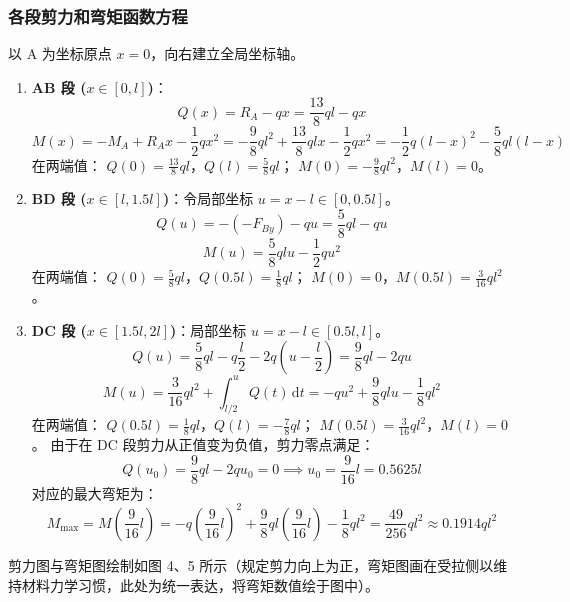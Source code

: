 \documentclass[UTF8,fontset=windows]{ctexart}
\newcommand{\diff}{\,\mathrm{d}}
\begin{document}
\subsubsection*{各段剪力和弯矩函数方程}
以 A 为坐标原点 $x=0$，向右建立全局坐标轴。
\begin{enumerate}
    \item \textbf{AB 段 ($x \in [0, l]$)}：
          \[
              Q(x) = R_A - qx = \frac{13}{8} ql - qx
          \]
          \[
              M(x) = -M_A + R_A x - \frac{1}{2} qx^2 = -\frac{9}{8} ql^2 + \frac{13}{8} qlx - \frac{1}{2} qx^2 = -\frac{1}{2}q(l-x)^2 - \frac{5}{8}ql(l-x)
          \]
          在两端值：
          $Q(0) = \frac{13}{8} ql$，$Q(l) = \frac{5}{8} ql$；
          $M(0) = -\frac{9}{8} ql^2$，$M(l) = 0$。
    \item \textbf{BD 段 ($x \in [l, 1.5l]$)}：令局部坐标 $u = x-l \in [0, 0.5l]$。
          \[
              Q(u) = -(-F_{By}) - qu = \frac{5}{8} ql - qu
          \]
          \[
              M(u) = \frac{5}{8} ql u - \frac{1}{2} qu^2
          \]
          在两端值：
          $Q(0) = \frac{5}{8} ql$，$Q(0.5l) = \frac{1}{8} ql$；
          $M(0) = 0$，$M(0.5l) = \frac{3}{16} ql^2$。
    \item \textbf{DC 段 ($x \in [1.5l, 2l]$)}：局部坐标 $u = x-l \in [0.5l, l]$。
          \[
              Q(u) = \frac{5}{8} ql - q \frac{l}{2} - 2q \left( u - \frac{l}{2} \right) = \frac{9}{8} ql - 2qu
          \]
          \[
              M(u) = \frac{3}{16} ql^2 + \int_{l/2}^{u} Q(t) \diff t = -qu^2 + \frac{9}{8} qlu - \frac{1}{8} ql^2
          \]
          在两端值：
          $Q(0.5l) = \frac{1}{8} ql$，$Q(l) = -\frac{7}{8} ql$；
          $M(0.5l) = \frac{3}{16} ql^2$，$M(l) = 0$。
          由于在 DC 段剪力从正值变为负值，剪力零点满足：
          \[
              Q(u_0) = \frac{9}{8} ql - 2q u_0 = 0 \implies u_0 = \frac{9}{16} l = 0.5625 l
          \]
          对应的最大弯矩为：
          \[
              M_{\text{max}} = M\left(\frac{9}{16}l\right) = -q \left(\frac{9}{16}l\right)^2 + \frac{9}{8} ql \left(\frac{9}{16}l\right) - \frac{1}{8} ql^2 = \frac{49}{256} ql^2 \approx 0.1914 ql^2
          \]
\end{enumerate}

剪力图与弯矩图绘制如图 4、5 所示（规定剪力向上为正，弯矩图画在受拉侧以维持材料力学习惯，此处为统一表达，将弯矩数值绘于图中）。
\end{document}
